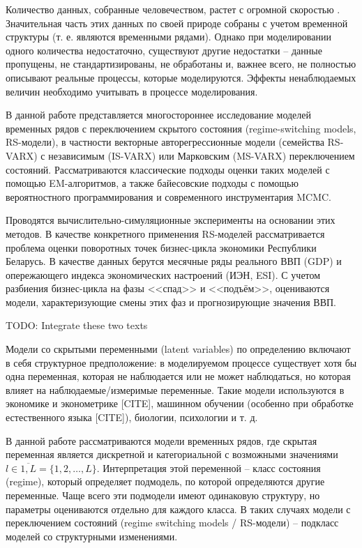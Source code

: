 \documentclass[a4paper,14pt]{extreport}
\begin{document}
Количество данных, собранные человечеством, растет с огромной скоростью \cite{idc_data_2025}. Значительная часть этих данных по своей природе собраны с учетом временной структуры (т. е. являются временными рядами). Однако при моделировании одного количества недостаточно, существуют другие недостатки -- данные пропущены, не стандартизированы, не обработаны и, важнее всего, не полностью описывают реальные процессы, которые моделируются. Эффекты ненаблюдаемых величин необходимо учитывать в процессе моделирования.

В данной работе представляется многостороннее исследование моделей временных рядов с переключением скрытого состояния (regime-switching models, RS-модели), в частности векторные авторегрессионные модели (семейства RS-VARX) с независимым (IS-VARX) или Марковским (MS-VARX) переключением состояний.
Рассматриваются классические подходы оценки таких моделей с помощью EM-алгоритмов, а также байесовские подходы с помощью вероятностного программирования и современного инструментария MCMC.

Проводятся вычислительно-симуляционные эксперименты на основании этих методов. В качестве конкретного применения RS-моделей рассматривается проблема оценки поворотных точек бизнес-цикла экономики Республики Беларусь. В качестве данных берутся месячные ряды реального ВВП (GDP) и опережающего индекса экономических настроений (ИЭН, ESI). С учетом разбиения бизнес-цикла на фазы <<спад>> и <<подъём>>, оцениваются модели, характеризующие смены этих фаз и прогнозирующие значения ВВП.

TODO: Integrate these two texts

Модели со скрытыми переменными (latent variables) по определению включают в себя структурное предположение: в моделируемом процессе существует хотя бы одна переменная, которая не наблюдается или не может наблюдаться, но которая влияет на наблюдаемые/измеримые переменные. Такие модели используются в экономике и эконометрике [CITE], машинном обучении (особенно при обработке естественного языка [CITE]), биологии, психологии и т. д.

В данной работе рассматриваются модели временных рядов, где скрытая переменная является дискретной и категориальной с возможными значениями $l \in \overline{1,L} = \{1,2,\dots,L\}$. Интерпретация этой переменной -- класс состояния (regime), который определяет подмодель, по которой определяются другие переменные. Чаще всего эти подмодели имеют одинаковую структуру, но параметры оцениваются отдельно для каждого класса. В таких случаях модели с переключением состояний (regime switching models / RS-модели) – подкласс моделей со структурными изменениями.
\end{document}
